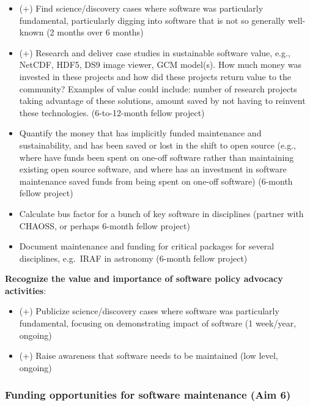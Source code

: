 \documentclass[
]{book}
\begin{document}
\begin{itemize}
\item
  (+) Find science/discovery cases where software was particularly fundamental, particularly digging
  into software that is not so generally well-known (2 months over 6 months)
\item
  (+) Research and deliver case studies in sustainable software value, e.g., NetCDF, HDF5, DS9 image viewer,
  GCM model(s). How much money was invested in these projects and how did these projects return value to
  the community? Examples of value could include: number of research projects taking advantage of these
  solutions, amount saved by not having to reinvent these technologies. (6-to-12-month fellow project)
\item
  Quantify the money that has implicitly funded maintenance and sustainability, and has been saved
  or lost in the shift to open source (e.g., where have funds been spent on one-off software rather
  than maintaining existing open source software, and where has an investment in software maintenance
  saved funds from being spent on one-off software) (6-month fellow project)
\item
  Calculate bus factor for a bunch of key software in disciplines (partner with CHAOSS, or perhaps
  6-month fellow project)
\item
  Document maintenance and funding for critical packages for several disciplines, e.g.~IRAF in astronomy
  (6-month fellow project)
\end{itemize}

\textbf{Recognize the value and importance of software policy advocacy activities}:

\begin{itemize}
\item
  (+) Publicize science/discovery cases where software was particularly fundamental, focusing on
  demonstrating impact of software (1 week/year, ongoing)
\item
  (+) Raise awareness that software needs to be maintained (low level, ongoing)
\end{itemize}

\hypertarget{funding-opportunities-for-software-maintenance-aim-6}{%
\subsubsection{Funding opportunities for software maintenance (Aim 6)}\label{funding-opportunities-for-software-maintenance-aim-6}}
\end{document}
